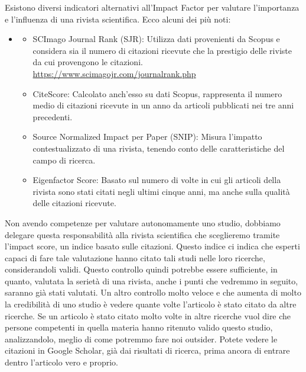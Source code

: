 \documentclass[12pt]{book} %
\begin{document}
Esistono diversi indicatori alternativi all'Impact Factor per valutare l'importanza e l'influenza di una rivista
scientifica. Ecco alcuni dei più noti:

\begin{itemize}
\item \begin{itemize}
\item SCImago Journal Rank (SJR): Utilizza dati provenienti da Scopus e considera sia il numero di citazioni ricevute
che la prestigio delle riviste da cui provengono le citazioni. \url{https://www.scimagojr.com/journalrank.php} 
\item CiteScore: Calcolato anch'esso su dati Scopus, rappresenta il numero medio di citazioni ricevute in un anno da
articoli pubblicati nei tre anni precedenti.
\item Source Normalized Impact per Paper (SNIP): Misura l'impatto contestualizzato di una rivista, tenendo conto delle
caratteristiche del campo di ricerca.
\item Eigenfactor Score: Basato sul numero di volte in cui gli articoli della rivista sono stati citati negli ultimi
cinque anni, ma anche sulla {\textquotedbl}qualità{\textquotedbl} delle citazioni ricevute.
\end{itemize}
\end{itemize}

\bigskip

Non avendo competenze per valutare autonomamente uno studio, dobbiamo delegare questa responsabilità alla rivista
scientifica che sceglieremo tramite l'impact score, un indice basato sulle citazioni. Questo indice ci indica che
esperti capaci di fare tale valutazione hanno citato tali studi nelle loro ricerche, considerandoli validi. Questo
controllo quindi potrebbe essere sufficiente, in quanto, valutata la serietà di una rivista, anche i punti che vedremmo
in seguito, saranno già stati valutati. Un altro controllo molto veloce e che aumenta di molto la credibilità di uno
studio è vedere quante volte l'articolo è stato citato da altre ricerche. Se un articolo è stato
citato molto volte in altre ricerche vuol dire che persone competenti in quella materia hanno ritenuto valido questo
studio, analizzandolo, meglio di come potremmo fare noi outsider. Potete vedere le citazioni in Google Scholar, già dai
risultati di ricerca, prima ancora di entrare dentro l'articolo vero e proprio.
\end{document}
